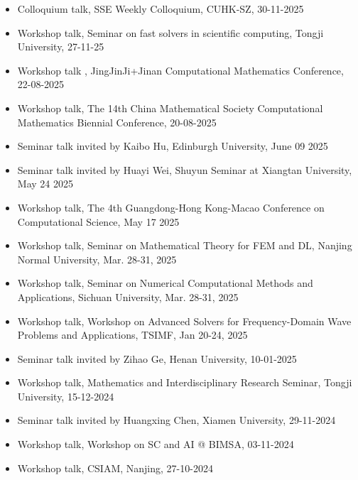 \documentclass[letterpaper]{article}
\begin{document}
\begin{itemize}[leftmargin=*]



\item  Colloquium talk, SSE Weekly Colloquium, CUHK-SZ, 30-11-2025 

 \item Workshop talk, Seminar on fast solvers in scientific computing, Tongji University, 27-11-25
 
 
\item Workshop talk ,  JingJinJi+Jinan Computational Mathematics Conference, 22-08-2025

\item Workshop talk, The 14th China Mathematical Society Computational Mathematics
Biennial Conference, 20-08-2025


\item   Seminar talk invited by  Kaibo Hu,  Edinburgh University, June 09 2025

\item   Seminar talk invited by Huayi Wei,  Shuyun Seminar at Xiangtan University, May 24 2025

\item Workshop talk, The 4th Guangdong-Hong Kong-Macao Conference on Computational Science, May 17 2025

\item Workshop talk, Seminar on Mathematical Theory for FEM and DL,
Nanjing Normal University, Mar. 28-31, 2025

\item Workshop talk, Seminar on Numerical Computational Methods and Applications,
Sichuan University, Mar. 28-31, 2025

\item Workshop talk, Workshop on Advanced Solvers for Frequency-Domain Wave Problems and Applications, TSIMF, Jan 20-24, 2025



\item  Seminar talk invited  by  Zihao Ge, Henan University, 10-01-2025
\item  Workshop talk, Mathematics and Interdisciplinary Research Seminar, Tongji University, 15-12-2024
\item  Seminar talk invited  by Huangxing Chen, Xiamen University,  29-11-2024
\item Workshop talk,  Workshop on SC and AI @ BIMSA, 03-11-2024
\item Workshop talk, CSIAM, Nanjing,  27-10-2024



\end{itemize}
\end{document}
